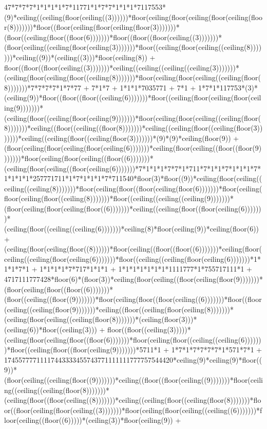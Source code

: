 47*7*7*7*1*1*1*1*7*11771*1*7*7*1*1*1*7117553*(9)*ceiling((ceiling(floor(ceiling((3))))))*floor(ceiling(floor(ceiling(floor(ceiling(floor(8)))))))*floor((floor(ceiling(floor(ceiling(floor(3)))))))*(floor((ceiling(floor((floor(6)))))))*floor((floor((floor(ceiling((3)))))))*(floor(ceiling((ceiling(floor(ceiling(3)))))))*floor((ceiling(floor(ceiling((ceiling(8)))))))*ceiling((9))*(ceiling((3)))*floor(ceiling(8)) + floor((floor((floor(ceiling((3)))))))*ceiling((ceiling((ceiling((ceiling(3)))))))*(ceiling(floor(ceiling(floor((ceiling(8)))))))*floor(ceiling(floor(ceiling((ceiling(floor(8)))))))*7*7*7*7*1*7*77 + 7*1*7 + 1*1*1*7035771 + 7*1 + 1*7*1*117753*(3)*(ceiling(9))*floor((floor((floor((ceiling(6)))))))*floor((ceiling(floor(ceiling(floor(ceiling(9)))))))*(ceiling(floor((ceiling(floor(ceiling(9)))))))*floor(ceiling(floor(ceiling((ceiling(floor(8)))))))*ceiling((floor((ceiling((floor(8)))))))*ceiling((ceiling(floor((ceiling(floor(3)))))))*ceiling((ceiling(floor((ceiling(floor(3)))))))*(9)*(9)*ceiling(floor(9)) + (floor(ceiling(floor(ceiling(floor(ceiling(6)))))))*ceiling(floor(ceiling((floor((floor(9)))))))*floor(ceiling(floor(ceiling((floor((6)))))))*(ceiling(floor(ceiling((floor(ceiling(6)))))))*7*1*1*1*7*7*1*711*7*1*1*7*1*1*1*7*1*1*1*1*257771711*1*7*1*1*1*7*711540*floor(3)*floor((9))*ceiling(floor(ceiling((ceiling((ceiling(8)))))))*floor(ceiling(floor((floor(ceiling(floor(6)))))))*floor(ceiling(floor(ceiling(floor((ceiling(8)))))))*floor((ceiling((ceiling((ceiling(9)))))))*(floor(ceiling(floor(ceiling(floor((6)))))))*ceiling((ceiling(floor((floor(ceiling(6)))))))*(ceiling(floor((ceiling((ceiling(6)))))))*ceiling(8)*floor(ceiling(9))*ceiling(floor(6)) + (ceiling(floor(ceiling(floor((8))))))*floor(ceiling((floor((floor((6)))))))*ceiling(floor(ceiling((ceiling(floor(ceiling(6)))))))*floor((ceiling((ceiling(floor(ceiling(6)))))))*1*1*1*7*1 + 1*1*1*1*7*717*1*1*1 + 1*1*1*1*1*1*1*1111777*1*755717111*1 + 4717111777428*floor(6)*(floor(3))*ceiling(floor(ceiling((floor(ceiling(floor(9)))))))*(floor(ceiling(floor((floor((6)))))))*(floor((ceiling((floor((9)))))))*floor(ceiling(floor((floor(ceiling((6)))))))*floor((floor(ceiling((ceiling(floor(9)))))))*ceiling((floor((ceiling(floor(ceiling(8)))))))*(ceiling(floor(ceiling((ceiling(floor(8)))))))*(ceiling(floor(3)))*(ceiling(6))*floor((ceiling(3))) + floor((floor((ceiling(3)))))*(ceiling(floor(ceiling(floor((floor(6)))))))*floor(ceiling(floor((ceiling((ceiling(6)))))))*floor((ceiling(floor((floor(ceiling(9)))))))*5711*1 + 1*7*1*7*7*7*7*1*571*7*1 + 17455777711117443333455743771111111777757544420*ceiling(9)*ceiling(9)*floor((9))*(floor(ceiling((ceiling(floor((9)))))))*ceiling((floor((floor(ceiling((9)))))))*floor(ceiling((ceiling((ceiling(floor(8)))))))*(ceiling(floor((floor(ceiling((8)))))))*ceiling((ceiling(floor((ceiling(floor(8)))))))*floor((floor(ceiling(floor(ceiling((3)))))))*floor(ceiling(floor(ceiling((ceiling((6)))))))*floor(ceiling((floor((6)))))*(ceiling(3))*floor(ceiling(9)) + 